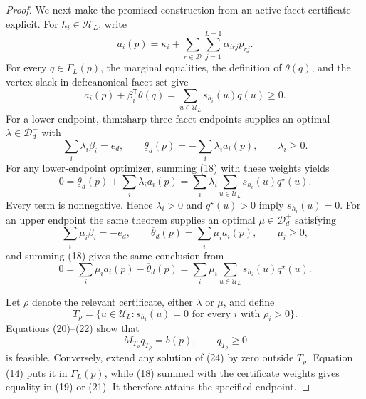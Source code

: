 \documentclass{article}
\begin{document}
\begin{proof}
We next make the promised construction from an active facet certificate explicit.  For \(h_i\in\mathcal H_L\), write
\[
 a_i(p)=\kappa_i+\sum_{r\in\mathcal D}\sum_{j=1}^{L-1}\alpha_{irj}p_{rj}.
\]
For every \(q\in\Gamma_L(p)\), the marginal equalities, the definition of \(\theta(q)\), and the vertex slack in \(\text{def:canonical-facet-set}\) give
\[
 a_i(p)+\beta_i^{\mathsf T}\theta(q)
 =\sum_{u\in\mathcal U_L}s_{h_i}(u)q(u)\geq0.                              \tag{18}
\]
For a lower endpoint, \(\text{thm:sharp-three-facet-endpoints}\) supplies an optimal \(\lambda\in\mathcal D_d^-\) with
\[
 \sum_i\lambda_i\beta_i=e_d,
 \qquad
 \underline\theta_d(p)=-\sum_i\lambda_i a_i(p),
 \qquad \lambda_i\geq0.                                                     \tag{19}
\]
For any lower-endpoint optimizer, summing (18) with these weights yields
\[
 0=\underline\theta_d(p)+\sum_i\lambda_i a_i(p)
 =\sum_i\lambda_i\sum_{u\in\mathcal U_L}s_{h_i}(u)q^\star(u).             \tag{20}
\]
Every term is nonnegative.  Hence \(\lambda_i>0\) and \(q^\star(u)>0\) imply \(s_{h_i}(u)=0\).  For an upper endpoint the same theorem supplies an optimal \(\mu\in\mathcal D_d^+\) satisfying
\[
 \sum_i\mu_i\beta_i=-e_d,
 \qquad
 \overline\theta_d(p)=\sum_i\mu_i a_i(p),
 \qquad \mu_i\geq0,                                                        \tag{21}
\]
and summing (18) gives the same conclusion from
\[
 0=\sum_i\mu_i a_i(p)-\overline\theta_d(p)
 =\sum_i\mu_i\sum_{u\in\mathcal U_L}s_{h_i}(u)q^\star(u).                \tag{22}
\]

Let \(\rho\) denote the relevant certificate, either \(\lambda\) or \(\mu\), and define
\[
 T_\rho=\{u\in\mathcal U_L:s_{h_i}(u)=0
             \text{ for every }i\text{ with }\rho_i>0\}.                  \tag{23}
\]
Equations (20)--(22) show that
\[
 M_{T_\rho}q_{T_\rho}=b(p),\qquad q_{T_\rho}\geq0                         \tag{24}
\]
is feasible.  Conversely, extend any solution of (24) by zero outside \(T_\rho\).  Equation (14) puts it in \(\Gamma_L(p)\), while (18) summed with the certificate weights gives equality in (19) or (21).  It therefore attains the specified endpoint.


\end{proof}
\end{document}
